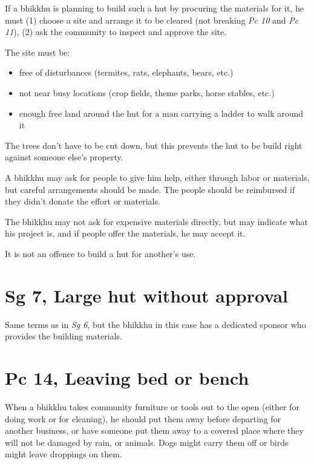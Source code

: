 If a bhikkhu is planning to build such a hut by procuring the materials
for it, he must (1) choose a site and arrange it to be cleared (not
breaking \emph{Pc 10} and \emph{Pc 11}), (2) ask the community to
inspect and approve the site.

The site must be:

\begin{itemize}
\tightlist
\item
  free of disturbances (termites, rats, elephants, bears, etc.)
\item
  not near busy locations (crop fields, theme parks, horse stables,
  etc.)
\item
  enough free land around the hut for a man carrying a ladder to walk
  around it
\end{itemize}

The trees don't have to be cut down, but this prevents the hut to be
build right against someone else's property.

A bhikkhu may ask for people to give him help, either through labor or
materials, but careful arrangements should be made. The people should be
reimbursed if they didn't donate the effort or materials.

The bhikkhu may not ask for expensive materials directly, but may
indicate what his project is, and if people offer the materials, he may
accept it.

It is not an offence to build a hut for another's use.

\enlargethispage*{2\baselineskip}

\section{Sg 7, Large hut without approval}

Same terms as in \emph{Sg 6}, but the bhikkhu in this case has a
dedicated sponsor who provides the building materials.

\clearpage

\section{Pc 14, Leaving bed or bench}

When a bhikkhu takes community furniture or tools out to the open
(either for doing work or for cleaning), he should put them away before
departing for another business, or have someone put them away to a
covered place where they will not be damaged by rain, or animals. Dogs
might carry them off or birds might leave droppings on them.

